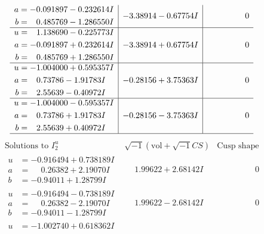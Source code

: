 \documentclass[1p]{elsarticle_modified}
\theoremstyle{definition}
\newcommand{\I}{\sqrt{-1}}
\begin{document}
$$\begin{array}{c|c|c}
\begin{aligned}
a &= -0.091897 - 0.232614 I \\
b &= \phantom{-}0.485769 - 1.286550 I\end{aligned}
 & -3.38914 - 0.67754 I & \phantom{-0.000000 } 0 \\ \hline\begin{aligned}
u &= \phantom{-}1.138690 - 0.225773 I \\
a &= -0.091897 + 0.232614 I \\
b &= \phantom{-}0.485769 + 1.286550 I\end{aligned}
 & -3.38914 + 0.67754 I & \phantom{-0.000000 } 0 \\ \hline\begin{aligned}
u &= -1.004000 + 0.595357 I \\
a &= \phantom{-}0.73786 - 1.91783 I \\
b &= \phantom{-}2.55639 - 0.40972 I\end{aligned}
 & -0.28156 + 3.75363 I & \phantom{-0.000000 } 0 \\ \hline\begin{aligned}
u &= -1.004000 - 0.595357 I \\
a &= \phantom{-}0.73786 + 1.91783 I \\
b &= \phantom{-}2.55639 + 0.40972 I\end{aligned}
 & -0.28156 - 3.75363 I & \phantom{-0.000000 } 0\\
 \hline 
 \end{array}$$\newpage$$\begin{array}{c|c|c}  
\text{Solutions to }I^u_{2}& \I (\text{vol} + \sqrt{-1}CS) & \text{Cusp shape}\\
 \hline 
\begin{aligned}
u &= -0.916494 + 0.738189 I \\
a &= \phantom{-}0.26382 + 2.19070 I \\
b &= -0.94011 + 1.28799 I\end{aligned}
 & \phantom{-}1.99622 + 2.68142 I & \phantom{-0.000000 } 0 \\ \hline\begin{aligned}
u &= -0.916494 - 0.738189 I \\
a &= \phantom{-}0.26382 - 2.19070 I \\
b &= -0.94011 - 1.28799 I\end{aligned}
 & \phantom{-}1.99622 - 2.68142 I & \phantom{-0.000000 } 0 \\ \hline\begin{aligned}
u &= -1.002740 + 0.618362 I \\

\end{aligned}
\end{array}$$
\end{document}
